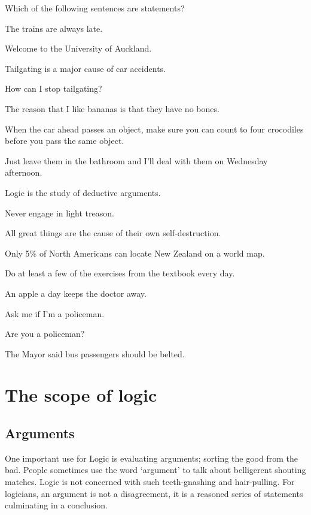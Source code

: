 \documentclass[PHIL101-Textbook.tex]{subfiles}
\begin{document}
\problempart
Which of the following sentences are statements?
\begin{earg}
	\item The trains are always late.	
	\item Welcome to the University of Auckland.
	\item Tailgating is a major cause of car accidents.	
	\item How can I stop tailgating?
	\item The reason that I like bananas is that they have no bones.
	\item When the car ahead passes an object, make sure you can count to four crocodiles before you pass the same object.
	\item Just leave them in the bathroom and I'll deal with them on Wednesday afternoon.
	\item Logic is the study of deductive arguments.
	\item Never engage in light treason.
	\item All great things are the cause of their own self-destruction.
	\item Only 5\% of North Americans can locate New Zealand on a world map.
	\item Do at least a few of the exercises from the textbook every day.
	\item An apple a day keeps the doctor away.
	\item Ask me if I'm a policeman.
	\item Are you a policeman?
	\item The Mayor said bus passengers should be belted.
\end{earg}



\chapter{The scope of logic}\label{ch:Valid}


\section{Arguments}
One important use for Logic is evaluating arguments; sorting the good from the bad. 
People sometimes use the word `argument' to talk about belligerent shouting matches. Logic is not concerned with such teeth-gnashing and hair-pulling. For logicians, an argument is not a disagreement, it is a reasoned series of statements culminating in a conclusion. 
\end{document}
